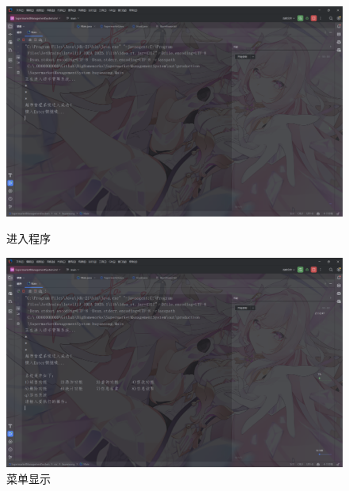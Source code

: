 \documentclass[12pt, a4paper, oneside]{ctexart}
\begin{document}
\begin{figure}[H]
    \begin{minipage}[t]{0.48\textwidth}
        \includegraphics[width=\textwidth]{../images/进入程序.png}
        \caption{进入程序}
    \end{minipage}
    \hfill
    \begin{minipage}[t]{0.48\textwidth}
        \includegraphics[width=\textwidth]{../images/菜单显示.png}
        \caption{菜单显示}
    \end{minipage}
\end{figure}
\end{document}
